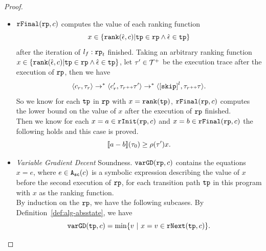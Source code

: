 \begin{proof}
\begin{itemize}
\[\begin{array}{l}
       \econfig{
       \rfinit(l: \rprog)}(\trace_0)
       -
       \\ \qquad
     \econfig{
      \begin{array}{l}
        \sum\limits_{\absevent \in \inc(x, c) }
         \left\{ v ~\middle\vert~ \absevent = (l, x' \leq x + v, \_) \land l \in \tpath\right\}
         \\ \qquad 
         + \max\limits_{l' }
            \left\{ \varinvar(y, c) + v ~\middle\vert~ (l, x' \leq y + v, l') \in \reset(x, c) \land l \in \tpath\right\}
            \\ \qquad 
           - \sum\limits_{ \absevent \in \dec(x, c) } \left\{ 
             v ~\middle\vert~ \absevent = (l, x' \leq x - v, \_) \land l \in \tpath 
             \right\}
           \end{array}
     }(\trace_0) \\
     \leq \env(\trace') x.
   \end{array}
   \]
 \item $\mathtt{rFinal}(\mathtt{rp}, c)$ computes the value of 
 each ranking function 
 $$x \in \left\{ \rank(\absevent, c) | \tpath \in \rprog \land \absevent \in \tpath \right\}$$ 
 after the iteration of $l_f:\mathtt{rp}_t$ finished.
 Taking an arbitrary ranking function $x \in \left\{ \rank(\absevent, c) | \tpath \in \rprog \land \absevent \in \tpath \right\}$,
 let $\mathtt{\tau}' \in \mathcal{T}^{+}$ be the execution trace after the execution of $\mathtt{rp}$,  then we have
 \[
   \config{c_r, \trace_r} \to^* \config{c_r', \trace_r \tracecat \trace'} \to^* \config{\clabel{\eskip}^{l}, \trace_r \tracecat \trace}.
 \]
So we know for each $\mathtt{tp}$ in $\mathtt{rp}$ with $x = \mathtt{rank}(\mathtt{tp})$,
$\mathtt{rFinal}(\mathtt{rp}, c)$ computes the lower bound on the value of $x$ after the execution of $\mathtt{rp}$ finished.
\\
Then we know for each $ x = a \in \mathtt{rInit}(\mathtt{rp}, c) $ and $ x = b \in \mathtt{rFinal}(\mathtt{rp}, c) $
the following holds and this case is proved.
\[
  \llbracket a - b \rrbracket(\mathtt{\tau}_0) \geq \rho(\mathtt{\tau}') x.
\]
\item   \emph{Variable Gradient Decent} Soundness.
$\mathtt{varGD}(\mathtt{rp}, c)$ contains the equations $x = e$, where $e \in {\ensuremath{\mathtt{A_{sc}}}}(c)$ is a
  symbolic expression describing the value of $x$ before the second execution of $\mathtt{rp}$,
  for each transition path $\mathtt{tp}$ in this program with $x$ as the ranking function.
\\
 By induction on the $\mathtt{rp}$, we have the following subcases.
 By Definition~\ref{def:alg-absstate}, we have
\[
   \varGD(\tpath, c) =  \min\left\{v  ~|~ x = v \in \rfnext(\tpath, c) \right\}.
\]
\end{itemize}
\end{proof}
